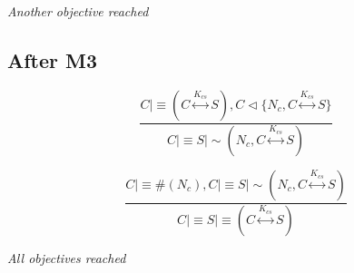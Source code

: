 \emph{Another objective reached}


\subsection{After M3}

\begin{equation}
\frac{
	C \mid\equiv ( C \stackrel {K_{cs}}\longleftrightarrow S ), C \triangleleft \{ N_{c}, C \stackrel {K_{cs}}\longleftrightarrow S \} 
}
{
	C \mid\equiv S \mid\sim ( N_{c}, C \stackrel {K_{cs}}\longleftrightarrow S )  
}
\end{equation}

\begin{equation}
\frac{
	C \mid\equiv \#(N_{c}), C \mid\equiv S  \mid\sim ( N_{c}, C \stackrel {K_{cs}}\longleftrightarrow S )
}
{
	C \mid\equiv S \mid\equiv ( C \stackrel {K_{cs}}\longleftrightarrow S )
}
\end{equation}

\emph{All objectives reached}
